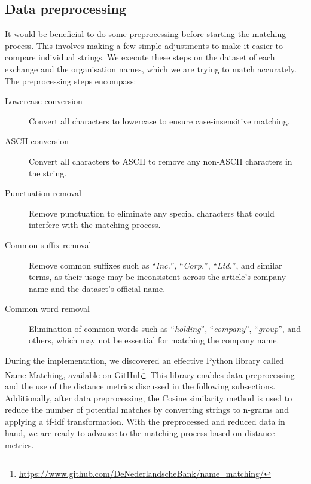 \subsection{Data preprocessing}
\label{subsec:data-processing}
It would be beneficial to do some preprocessing before starting the matching process. This involves making a few simple adjustments to make it easier to compare individual strings. We execute these steps on the dataset of each exchange and the organisation names, which we are trying to match accurately. The preprocessing steps encompass:

\begin{description}
    \item[Lowercase conversion] Convert all characters to lowercase to ensure case-insensitive matching.
    \item[ASCII conversion] Convert all characters to ASCII to remove any non-ASCII characters in the string.
    \item[Punctuation removal] Remove punctuation to eliminate any special characters that could interfere with the matching process.
    \item[Common suffix removal] Remove common suffixes such as ``\textit{Inc.}'', ``\textit{Corp.}'', ``\textit{Ltd.}'', and similar terms, as their usage may be inconsistent across the article's company name and the dataset's official name.
    \item[Common word removal] Elimination of common words such as ``\textit{holding}'', ``\textit{company}'', ``\textit{group}'', and others, which may not be essential for matching the company name.
\end{description}

During the implementation, we discovered an effective Python library called Name Matching, available on GitHub\footnote{\href{https://www.github.com/DeNederlandscheBank/name\_matching/}{https://www.github.com/DeNederlandscheBank/name\_matching/}}. This library enables data preprocessing and the use of the distance metrics discussed in the following subsections. Additionally, after data preprocessing, the Cosine similarity method is used to reduce the number of potential matches by converting strings to n-grams and applying a \acrshort{tf-idf} transformation. With the preprocessed and reduced data in hand, we are ready to advance to the matching process based on distance metrics.

